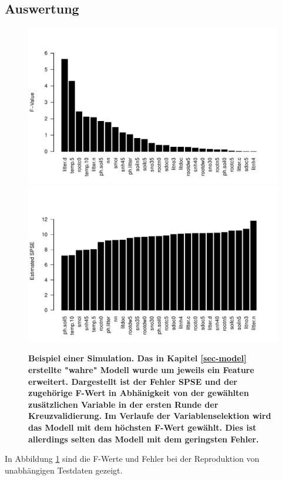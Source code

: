 \subsection{Auswertung}
\begin{figure}[htbp]
	\centering
	\includegraphics[width=\textwidth]{fig/simul/simul-f.pdf}
	\includegraphics[width=\textwidth]{fig/simul/simul-spse.pdf}
	\caption{\bf{Beispiel einer Simulation.} 
		Das in Kapitel \ref{sec-model} erstellte "wahre" Modell wurde um jeweils ein Feature erweitert.
		Dargestellt ist der Fehler \bf{SPSE} und der zugehörige \bf{F-Wert} in Abhänigkeit von der gewählten zusätzlichen Variable in der ersten Runde der Kreuzvalidierung.
		Im Verlaufe der Variablenselektion wird das Modell mit dem höchsten F-Wert gewählt.
		Dies ist allerdings selten das Modell mit dem geringsten Fehler.
	}
	\label{fig-simul-f-spse}
\end{figure}
In Abbildung \ref{fig-simul-f-spse} sind die F-Werte und Fehler bei der Reproduktion von unabhängigen Testdaten gezeigt.
